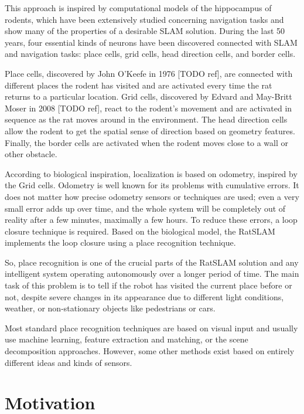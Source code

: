 This approach is inspired by computational models of the hippocampus of rodents, which have been extensively studied concerning navigation tasks and show many of the properties of a desirable SLAM solution. During the last 50 years, four essential kinds of neurons have been discovered connected with SLAM and navigation tasks: place cells, grid cells, head direction cells, and border cells.\par
Place cells, discovered by John O'Keefe in 1976 [TODO ref], are connected with different places the rodent has visited and are activated every time the rat returns to a particular location. Grid cells, discovered by Edvard and May-Britt Moser in 2008 [TODO ref], react to the rodent's movement and are activated in sequence as the rat moves around in the environment. The head direction cells allow the rodent to get the spatial sense of direction based on geometry features. Finally, the border cells are activated when the rodent moves close to a wall or other obstacle.\par
According to biological inspiration, localization is based on odometry, inspired by the Grid cells. Odometry is well known for its problems with cumulative errors. It does not matter how precise odometry sensors or techniques are used; even a very small error adds up over time, and the whole system will be completely out of reality after a few minutes, maximally a few hours. To reduce these errors, a loop closure technique is required. Based on the biological model, the RatSLAM implements the loop closure using a place recognition technique.\par
So, place recognition is one of the crucial parts of the RatSLAM solution and any intelligent system operating autonomously over a longer period of time. The main task of this problem is to tell if the robot has visited the current place before or not, despite severe changes in its appearance due to different light conditions, weather, or non-stationary objects like pedestrians or cars.\par
Most standard place recognition techniques are based on visual input and usually use machine learning, feature extraction and matching, or the scene decomposition approaches. However, some other methods exist based on entirely different ideas and kinds of sensors.


\section{Motivation}

